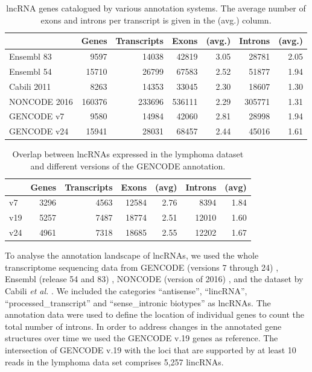 \documentclass[ncrna,article,submit,moreauthors,pdftex,10pt,a4paper]{mdpi}
\begin{document}
\begin{table}[ht]
  \caption{lncRNA genes catalogued by various annotation systems. The
    average number of exons and introns per transcript is given in the
    (avg.) column.} 
\label{tab:consortia}
\begin{center}\small
\begin{tabular}{|l|rr|rr|rr|}
  \hline
  & Genes & Transcripts & Exons & (avg.) & 
                        Introns & (avg.) \\ 
   \hline
  Ensembl 83   &   9597 &  14038 &  42819 & 3.05 &  28781 & 2.05 \\ 
  Ensembl 54   &  15710 &  26799 &  67583 & 2.52 &  51877 & 1.94 \\ 
  Cabili 2011  &   8263 &  14353 &  33045 & 2.30 &  18607 & 1.30 \\ 
  NONCODE 2016 & 160376 & 233696 & 536111 & 2.29 & 305771 & 1.31 \\ 
  GENCODE v7   &   9580 &  14984 &  42060 & 2.81 &  28998 & 1.94 \\ 
  GENCODE v24  &  15941 &  28031 &  68457 & 2.44 &  45016 & 1.61 \\ 
   \hline
\end{tabular}
\end{center}
\end{table}

\begin{table}[ht]
  \caption{Overlap between lncRNAs expressed in the lymphoma dataset 
    and different versions of the GENCODE annotation.} 
\label{tab:gencode}
\begin{center}\small
\begin{tabular}{|l|rr|rr|rr|}
  \hline
  & Genes & Transcripts & Exons & (avg) & Introns & (avg) \\ 
   \hline
  v7  & 3296 & 4563 & 12584 & 2.76 &  8394 & 1.84 \\
  v19 & 5257 & 7487 & 18774 & 2.51 & 12010 & 1.60 \\
  v24 & 4961 & 7318 & 18685 & 2.55 & 12202 & 1.67 \\ 
   \hline
\end{tabular}
\end{center}
\end{table}

To analyse the annotation landscape of lncRNAs, we used the whole
transcriptome sequencing data from GENCODE (versions 7 through 24)
\cite{harrow2012}, Ensembl (release 54 and 83) \cite{flicek2014}, NONCODE
(version of 2016) \cite{zhao2016}, and the dataset by Cabili \textit{et
  al.}  \cite{cabili2011}. We included the categories ``antisense'',
``lincRNA'', ``processed\_transcript'' and ``sense\_intronic biotypes'' as
lncRNAs.  The annotation data were used to define the location of
individual genes to count the total number of introns. In order to address
changes in the annotated gene structures over time we used the GENCODE v.19
genes as reference. The intersection of GENCODE v.19 with the loci that are
supported by at least 10 reads in the lymphoma data set comprises 5,257
lincRNAs.
\end{document}
